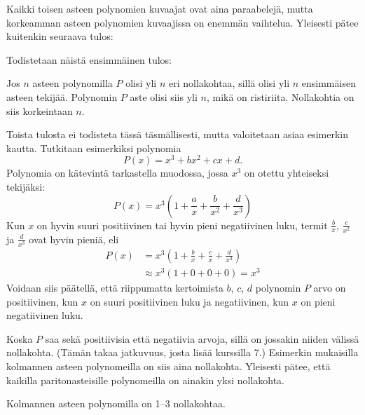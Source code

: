 
Kaikki toisen asteen polynomien kuvaajat ovat aina paraabelejä, mutta korkeamman asteen polynomien kuvaajissa on enemmän vaihtelua. Yleisesti pätee kuitenkin seuraava tulos:


Todistetaan näistä ensimmäinen tulos:

\begin{todistus}
Jos $n$ asteen polynomilla $P$ olisi yli $n$ eri nollakohtaa, sillä olisi yli $n$ ensimmäisen asteen tekijää. Polynomin $P$ aste olisi siis yli $n$, mikä on ristiriita. Nollakohtia on siis korkeintaan $n$.
\end{todistus}

Toista tulosta ei todisteta tässä täsmällisesti, mutta valoitetaan asiaa esimerkin kautta. Tutkitaan esimerkiksi polynomia 
$$P(x)=x^3+bx^2+cx+d.$$
Polynomia on kätevintä tarkastella muodossa, jossa $x^3$ on otettu yhteiseksi tekijäksi:
$$P(x) = x^3\left(1+\frac{a}{x}+\frac{b}{x^2}+\frac{d}{x^3}\right)$$
Kun $x$ on hyvin suuri positiivinen tai hyvin pieni negatiivinen luku,
termit $\frac{b}{x}$, $\frac{c}{x^2}$ ja $\frac{d}{x^3}$ ovat hyvin pieniä, eli
\begin{align*}
P(x)&= x^3\left(1+\frac{b}{x}+\frac{c}{x}+\frac{d}{x^3}\right) \\
	& \approx  x^3\left(1+0+0+0\right) = x^3
\end{align*}
Voidaan siis päätellä, että riippumatta kertoimista $b$, $c$, $d$ polynomin $P$ arvo on positiivinen, kun $x$ on suuri positiivinen luku ja negatiivinen, kun $x$ on pieni negatiivinen luku.

Koska $P$ saa sekä positiivisia että negatiivia arvoja, sillä on jossakin niiden välissä nollakohta. (Tämän takaa jatkuvuus, josta lisää kurssilla 7.) Esimerkin mukaisilla kolmannen asteen polynomeilla on siis aina nollakohta. Yleisesti pätee, että kaikilla paritonasteisille polynomeilla on ainakin yksi nollakohta.

\begin{esimerkki} Kolmannen asteen polynomilla on 1--3 nollakohtaa.

\begin{lukusuora}{-2.5}{3}{3.6}
\lukusuoraisobbox
{}
\end{lukusuora}
\begin{lukusuora}{-2.8}{2.5}{3.6}
\lukusuoraisobbox
{}
\end{lukusuora}
\begin{lukusuora}{-2}{2}{3.6}
\lukusuoraisobbox
{}
\end{lukusuora}
\end{esimerkki}


